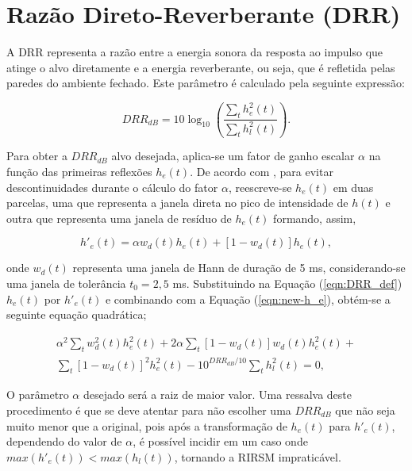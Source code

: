 \section{Razão Direto-Reverberante (DRR)}


A DRR representa a razão entre a energia sonora da resposta ao impulso que atinge o alvo diretamente e a energia reverberante,
ou seja, que é refletida pelas paredes do ambiente fechado. Este parâmetro é calculado pela seguinte expressão:

\begin{equation} \label{eqn:DRR_def}
    DRR_{dB} = 10 \log_{10} \left( \frac{\sum_t h^2_e(t)}{\sum_t h^2_l(t)} \right).
\end{equation}

Para obter a $DRR_{dB}$ alvo desejada, aplica-se um fator de ganho escalar $\alpha$ na função das primeiras reflexões $h_e(t)$.
De acordo com \cite{RIR_Data_Aug}, para evitar descontinuidades durante o cálculo do fator $\alpha$, reescreve-se 
$h_e(t)$ em duas parcelas, uma que representa a janela direta no pico de intensidade de $h(t)$ e outra
que representa uma janela de resíduo de $h_e(t)$ formando, assim,

\begin{equation} \label{eqn:new-h_e}
    h'_e(t) = \alpha w_d(t) h_e(t) + [1 - w_d(t)]h_e(t),
\end{equation}

\noindent
onde $w_d(t)$ representa uma janela de Hann de duração de 5 ms, considerando-se uma janela de tolerância $t_0 = 2,5$ ms.
Substituindo na Equação (\ref{eqn:DRR_def}) $h_e(t)$ por $h'_e(t)$ e combinando com a Equação (\ref{eqn:new-h_e}), obtém-se
a seguinte equação quadrática;

\begin{equation} \label{eqn:DRR_quad_eqn}
    \begin{aligned} 
        \alpha^2 \sum_t w^2_d(t) h^2_e(t) +
        2 \alpha \sum_t [1 - w_d(t)] w_d(t) h^2_e(t) + \\
        \sum_t [1 - w_d(t)]^2 h^2_e(t) -
        10^{DRR_{dB}/10} \sum_t h^2_l(t)
        = 0 ,
    \end{aligned}
\end{equation}

O parâmetro $\alpha$ desejado será a raiz de maior valor. 
Uma ressalva deste procedimento é que se deve atentar para não escolher uma $DRR_{dB}$ que não seja muito menor que a original,
pois após a transformação de $h_e(t)$ para $h'_e(t)$, dependendo do valor de $\alpha$, é possível incidir em um caso onde
$max(h'_e(t)) < max(h_l(t))$, tornando a RIRSM impraticável.

